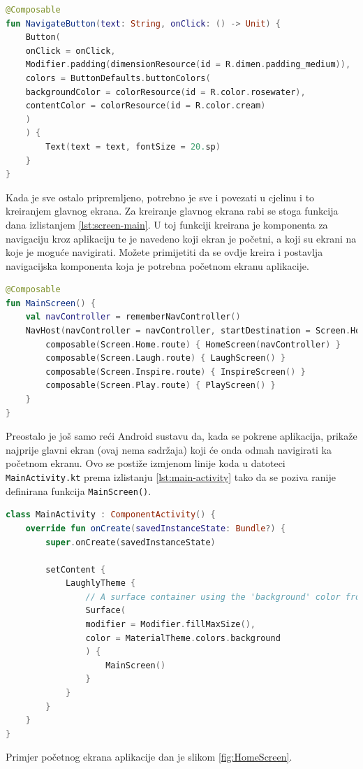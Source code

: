 \documentclass[11pt,a4paper,twoside]{article}
\begin{document}
\begin{lstlisting}[caption={Gumb za navigaciju - NavigateButton.kt}, label={lst:navigate-button}, language=Kotlin]
@Composable
fun NavigateButton(text: String, onClick: () -> Unit) {
	Button(
	onClick = onClick,
	Modifier.padding(dimensionResource(id = R.dimen.padding_medium)),
	colors = ButtonDefaults.buttonColors(
	backgroundColor = colorResource(id = R.color.rosewater),
	contentColor = colorResource(id = R.color.cream)
	)
	) {
		Text(text = text, fontSize = 20.sp)
	}
}
\end{lstlisting}

Kada je sve ostalo pripremljeno, potrebno je sve i povezati u cjelinu i to kreiranjem glavnog ekrana. Za kreiranje glavnog ekrana rabi se stoga funkcija dana izlistanjem \ref{lst:screen-main}. U toj funkciji kreirana je komponenta za navigaciju kroz aplikaciju te je navedeno koji ekran je početni, a koji su ekrani na koje je moguće navigirati. Možete primijetiti da se ovdje kreira i postavlja navigacijska komponenta koja je potrebna početnom ekranu aplikacije.

\begin{lstlisting}[caption={Glavni ekran - MainScreen.kt}, label={lst:screen-main}, language=Kotlin]
@Composable
fun MainScreen() {
	val navController = rememberNavController()
	NavHost(navController = navController, startDestination = Screen.Home.route) {
		composable(Screen.Home.route) { HomeScreen(navController) }
		composable(Screen.Laugh.route) { LaughScreen() }
		composable(Screen.Inspire.route) { InspireScreen() }
		composable(Screen.Play.route) { PlayScreen() }
	}
}
\end{lstlisting}

Preostalo je još samo reći Android sustavu da, kada se pokrene aplikacija, prikaže najprije glavni ekran (ovaj nema sadržaja) koji će onda odmah navigirati ka početnom ekranu. Ovo se postiže izmjenom linije koda u datoteci \texttt{MainActivity.kt} prema izlistanju \ref{lst:main-activity} tako da se poziva ranije definirana funkcija \texttt{MainScreen()}.

\begin{lstlisting}[caption={Glavna aktivnost - MainActivity.kt}, label={lst:activity-main}, language=Kotlin]
class MainActivity : ComponentActivity() {
	override fun onCreate(savedInstanceState: Bundle?) {
		super.onCreate(savedInstanceState)
		
		setContent {
			LaughlyTheme {
				// A surface container using the 'background' color from the theme
				Surface(
				modifier = Modifier.fillMaxSize(),
				color = MaterialTheme.colors.background
				) {
					MainScreen()
				}
			}
		}
	}
}
\end{lstlisting}
Primjer početnog ekrana aplikacije dan je slikom \ref{fig:HomeScreen}.
\end{document}
